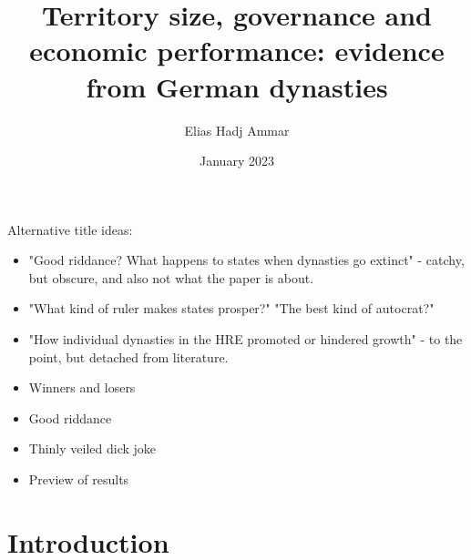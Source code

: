 \documentclass{article}
\title{Territory size, governance and economic performance: evidence from German dynasties}
\author{Elias Hadj Ammar}
\date{January 2023}
\begin{document}
\maketitle

Alternative title ideas: 
\begin{itemize}
    \item "Good riddance? What happens to states when dynasties go extinct" - catchy, but obscure, and also not what the paper is about.
    \item "What kind of ruler makes states prosper?" "The best kind of autocrat?"
    \item "How individual dynasties in the HRE promoted or hindered growth" - to the point, but detached from literature.
    \item Winners and losers
    \item Good riddance
    \item Thinly veiled dick joke
    \item Preview of results
\end{itemize}

\section{Introduction}
\end{document}
